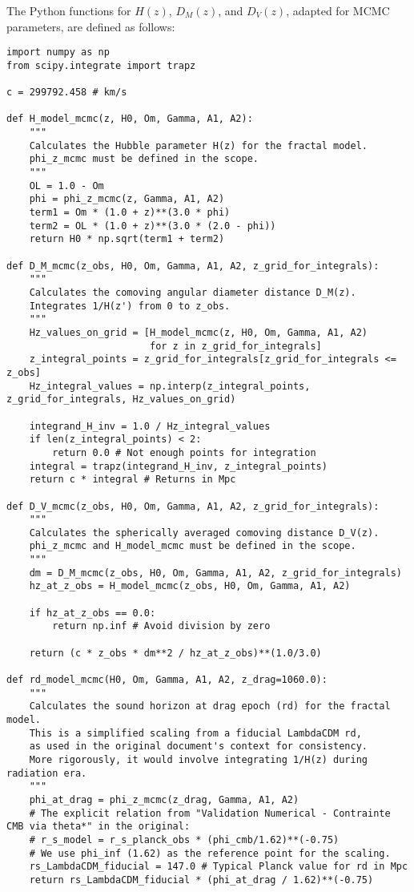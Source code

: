 \documentclass{article}
\begin{document}
The Python functions for $H(z)$, $D_M(z)$, and $D_V(z)$, adapted for MCMC parameters, are defined as follows:
\begin{lstlisting}
import numpy as np
from scipy.integrate import trapz

c = 299792.458 # km/s

def H_model_mcmc(z, H0, Om, Gamma, A1, A2):
    """
    Calculates the Hubble parameter H(z) for the fractal model.
    phi_z_mcmc must be defined in the scope.
    """
    OL = 1.0 - Om
    phi = phi_z_mcmc(z, Gamma, A1, A2)
    term1 = Om * (1.0 + z)**(3.0 * phi)
    term2 = OL * (1.0 + z)**(3.0 * (2.0 - phi))
    return H0 * np.sqrt(term1 + term2)

def D_M_mcmc(z_obs, H0, Om, Gamma, A1, A2, z_grid_for_integrals):
    """
    Calculates the comoving angular diameter distance D_M(z).
    Integrates 1/H(z') from 0 to z_obs.
    """
    Hz_values_on_grid = [H_model_mcmc(z, H0, Om, Gamma, A1, A2) 
                         for z in z_grid_for_integrals]
    z_integral_points = z_grid_for_integrals[z_grid_for_integrals <= z_obs]
    Hz_integral_values = np.interp(z_integral_points, z_grid_for_integrals, Hz_values_on_grid)
    
    integrand_H_inv = 1.0 / Hz_integral_values
    if len(z_integral_points) < 2:
        return 0.0 # Not enough points for integration
    integral = trapz(integrand_H_inv, z_integral_points)
    return c * integral # Returns in Mpc

def D_V_mcmc(z_obs, H0, Om, Gamma, A1, A2, z_grid_for_integrals):
    """
    Calculates the spherically averaged comoving distance D_V(z).
    phi_z_mcmc and H_model_mcmc must be defined in the scope.
    """
    dm = D_M_mcmc(z_obs, H0, Om, Gamma, A1, A2, z_grid_for_integrals)
    hz_at_z_obs = H_model_mcmc(z_obs, H0, Om, Gamma, A1, A2)
    
    if hz_at_z_obs == 0.0:
        return np.inf # Avoid division by zero
        
    return (c * z_obs * dm**2 / hz_at_z_obs)**(1.0/3.0)

def rd_model_mcmc(H0, Om, Gamma, A1, A2, z_drag=1060.0):
    """
    Calculates the sound horizon at drag epoch (rd) for the fractal model.
    This is a simplified scaling from a fiducial LambdaCDM rd,
    as used in the original document's context for consistency.
    More rigorously, it would involve integrating 1/H(z) during radiation era.
    """
    phi_at_drag = phi_z_mcmc(z_drag, Gamma, A1, A2)
    # The explicit relation from "Validation Numerical - Contrainte CMB via theta*" in the original:
    # r_s_model = r_s_planck_obs * (phi_cmb/1.62)**(-0.75)
    # We use phi_inf (1.62) as the reference point for the scaling.
    rs_LambdaCDM_fiducial = 147.0 # Typical Planck value for rd in Mpc
    return rs_LambdaCDM_fiducial * (phi_at_drag / 1.62)**(-0.75)
\end{lstlisting}
\end{document}
